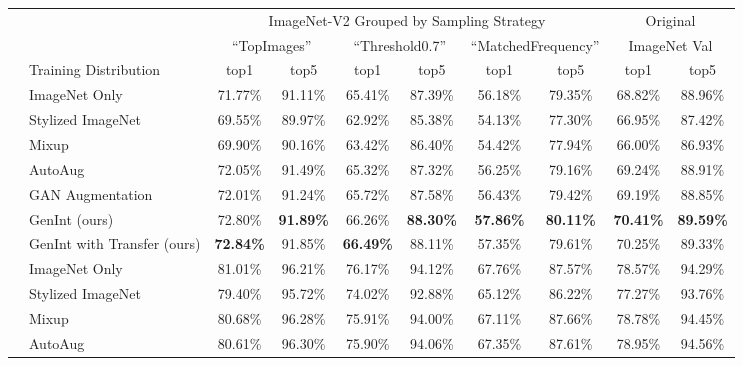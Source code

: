 \documentclass[final]{cvpr}
\begin{document}
\begin{table*}[t]
    \centering
    \vspace{-2mm}
    \footnotesize
    \begin{tabular}{ll|cc|cc|cc||cc}
         \toprule
         & & \multicolumn{6}{c||}{ImageNet-V2 Grouped by Sampling Strategy \cite{ImageNetOverfit}} & \multicolumn{2}{c}{Original}  \\
         & & \multicolumn{2}{c|}{``TopImages''} & \multicolumn{2}{c|}{``Threshold0.7''} & \multicolumn{2}{c||}{``MatchedFrequency''} & \multicolumn{2}{c}{ImageNet Val}  \\
         & Training Distribution & top1   & top5 & top1   & top5 & top1   & top5  & top1   & top5 \\
         \midrule  
\parbox[t]{3mm}{} & ImageNet Only \cite{He_2016} & 71.77\% & 91.11\% & 65.41\% & 87.39\% & 56.18\% & 79.35\% & 68.82\% & 88.96\%\\    
          & Stylized ImageNet \cite{imagenetbiased} & 69.55\% & 89.97\% & 62.92\% & 85.38\% & 54.13\% & 77.30\% & 66.95\% & 87.42\%\\
          & Mixup \cite{zhang2017mixup} & 69.90\% & 90.16\% & 63.42\% & 86.40\% & 54.42\% & 77.94\% & 66.00\% & 86.93\%\\
          & AutoAug \cite{cubuk2018autoaugment} & 72.05\% & 91.49\% & 65.32\% & 87.32\% & 56.25\% & 79.16\% & 69.24\% & 88.91\%\\
          
           & GAN Augmentation \cite{CAS}  & 72.01\% & 91.24\% & 65.72\% & 87.58\% & 56.43\% & 79.42\% & 69.19\% & 88.85\% \\
           & GenInt (ours) & 72.80\% & \textbf{91.89\%} & 66.26\% & \textbf{88.30\%} & \textbf{57.86\%} & \textbf{80.11\%} & \textbf{70.41\%} & \textbf{89.59\%} \\


           & GenInt with Transfer (ours) & \textbf{72.84\%} & 91.85\% & \textbf{66.49\%} & 88.11\% & 57.35\% & 79.61\% & 70.25\% & 89.33\%\\
           
           \midrule
\parbox[t]{3mm}{}   & ImageNet Only \cite{He_2016} & 81.01\% & 96.21\% & 76.17\% & 94.12\% & 67.76\% & 87.57\% & 78.57\% & 94.29\% \\    
          & Stylized ImageNet \cite{imagenetbiased} & 79.40\% & 95.72\% & 74.02\% & 92.88\% & 65.12\% & 86.22\% & 77.27\% & 93.76\% \\
          & Mixup \cite{zhang2017mixup} & 80.68\% & 96.28\% & 75.91\% & 94.00\% & 67.11\% & 87.66\% & 78.78\% & 94.45\% \\
          & AutoAug \cite{cubuk2018autoaugment} & 80.61\% & 96.30\% & 75.90\% & 94.06\% & 67.35\% & 87.61\% & 78.95\% & 94.56\%\\
          

\end{tabular}
\end{table*}
\end{document}
